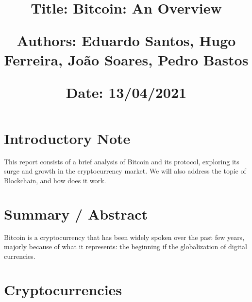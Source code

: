\documentclass{article}
\newcommand\tab[1][1cm]{\hspace*{#1}}
\begin{document}
\title{\vspace{-0.9cm}
       \vspace{1cm}
       \normalsize
       \raggedright\textbf{Title: \hspace{1.5cm} Bitcoin: An Overview} \\ \vspace{0.4cm}
       \raggedright\textbf{Authors: \hspace{0.95cm} Eduardo Santos, Hugo Ferreira, João Soares, Pedro Bastos} \\ \vspace{0.4cm}
       \raggedright\textbf{Date: \hspace{1.45cm} 13/04/2021} \\}
\author{}
\date{}

\maketitle
\thispagestyle{fancy}


\vspace{-1.4cm}

\tableofcontents


\fontsize{10pt}{13pt}
\selectfont
\lsstyle


\newpage

\section{Introductory Note}

\tab This report consists of a brief analysis of Bitcoin and its protocol, exploring its surge and growth in the cryptocurrency market.
We will also address the topic of Blockchain, and how does it work.

\section{Summary / Abstract}

\tab Bitcoin is a cryptocurrency that has been widely spoken over the past few years, majorly because of what it represents: the beginning if the globalization of digital currencies.

\section{Cryptocurrencies}
\end{document}
